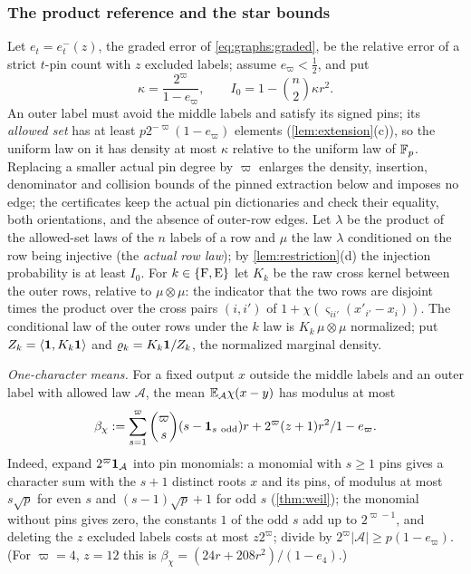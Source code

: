 \subsubsection{The product reference and the star bounds}
\label{subsec:push:layer72product}
Let $e_t=e^-_t(z)$, the graded error of \eqref{eq:graphs:graded}, be the relative
error of a strict $t$-pin count with $z$ excluded labels; assume $e_\varpi<\frac12$,
and put
\[
 \kappa=\frac{2^\varpi}{1-e_\varpi},\qquad I_0=1-\binom n2\kappa r^2 .
\]
An outer label must avoid the middle labels and satisfy its signed pins; its
\emph{allowed set} has at least $p2^{-\varpi}(1-e_\varpi)$ elements
(\cref{lem:extension}(c)), so the uniform law on it has density at most $\kappa$
relative to the uniform law of $\mathbb F_p$. Replacing a smaller actual pin degree by $\varpi$
enlarges the density, insertion, denominator and collision bounds of the pinned
extraction below and imposes no edge; the certificates keep the actual pin
dictionaries and check their equality, both orientations, and the absence of
outer-row edges. Let $\lambda$ be the product of the allowed-set laws of the $n$
labels of a row and $\mu$ the law $\lambda$ conditioned on the row being injective
(the \emph{actual row law}); by \cref{lem:restriction}(d) the injection probability
is at least $I_0$. For $k\in\{\rm F,E\}$ let $K_k$ be the raw cross kernel between
the outer rows, relative to $\mu\otimes\mu$: the indicator that the two rows are
disjoint times the product over the cross pairs $(i,i')$ of
$1+\chi(\varsigma_{ii'}(x'_{i'}-x_i))$. The conditional law of the outer rows under
the $k$ law is $K_k\,\mu\otimes\mu$ normalized; put $Z_k=\left\langle \mathbf 1,K_k\mathbf 1\right\rangle$ and
$\varrho_k=K_k\mathbf 1/Z_k$, the normalized marginal density.

\emph{One-character means.} For a fixed output $x$ outside the middle labels and an
outer label with allowed law $\mathcal A$, the mean $\mathbb E_{\mathcal A}\chi(x-y)$ has
modulus at most
\[
 \beta_\chi:=\frac{\sum_{s=1}^\varpi\binom{\varpi}{s}(s-\one_{s\ \rm odd})r
 +2^\varpi(z+1)r^2}{1-e_\varpi} .
\]
Indeed, expand $2^\varpi\mathbf 1_{\mathcal A}$ into pin monomials: a monomial with $s\ge1$
pins gives a character sum with the $s+1$ distinct roots $x$ and its pins, of
modulus at most $s\sqrt p$ for even $s$ and $(s-1)\sqrt p+1$ for odd $s$
(\cref{thm:weil}); the monomial without pins gives zero, the constants $1$ of the odd
$s$ add up to $2^{\varpi-1}$, and deleting the $z$ excluded labels costs at most $z2^\varpi$;
divide by $2^\varpi|\mathcal A|\ge p(1-e_\varpi)$. (For $\varpi=4$, $z=12$ this
is $\beta_\chi=(24r+208r^2)/(1-e_4)$.)


